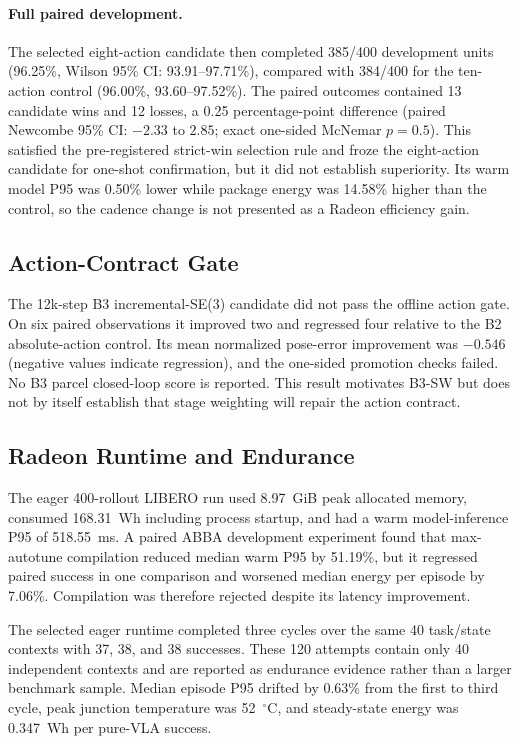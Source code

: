 \documentclass[11pt]{article}
\begin{document}
\paragraph{Full paired development.}
The selected eight-action candidate then completed 385/400 development units
(96.25\%, Wilson 95\% CI: 93.91--97.71\%), compared with 384/400 for the
ten-action control (96.00\%, 93.60--97.52\%). The paired outcomes contained 13
candidate wins and 12 losses, a 0.25 percentage-point difference (paired
Newcombe 95\% CI: $-2.33$ to $2.85$; exact one-sided McNemar $p=0.5$). This
satisfied the pre-registered strict-win selection rule and froze the eight-action
candidate for one-shot confirmation, but it did not establish superiority. Its
warm model P95 was 0.50\% lower while package energy was 14.58\% higher than the
control, so the cadence change is not presented as a Radeon efficiency gain.

\subsection{Action-Contract Gate}

The 12k-step B3 incremental-SE(3) candidate did not pass the offline action gate.
On six paired observations it improved two and regressed four relative to the B2
absolute-action control. Its mean normalized pose-error improvement was $-0.546$
(negative values indicate regression), and the one-sided promotion checks failed.
No B3 parcel closed-loop score is reported. This result motivates B3-SW but does
not by itself establish that stage weighting will repair the action contract.

\subsection{Radeon Runtime and Endurance}

The eager 400-rollout LIBERO run used 8.97~GiB peak allocated memory, consumed
168.31~Wh including process startup, and had a warm model-inference P95 of
518.55~ms. A paired ABBA development experiment found that max-autotune
compilation reduced median warm P95 by 51.19\%, but it regressed paired success in
one comparison and worsened median energy per episode by 7.06\%. Compilation was
therefore rejected despite its latency improvement.

The selected eager runtime completed three cycles over the same 40 task/state
contexts with 37, 38, and 38 successes. These 120 attempts contain only 40
independent contexts and are reported as endurance evidence rather than a larger
benchmark sample. Median episode P95 drifted by 0.63\% from the first to third
cycle, peak junction temperature was 52~$^\circ$C, and steady-state energy was
0.347~Wh per pure-VLA success.
\end{document}
